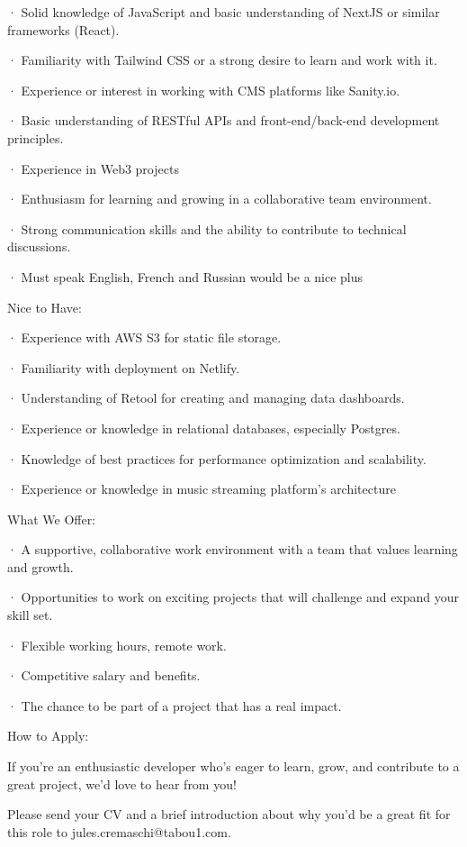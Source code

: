 · Solid knowledge of JavaScript and basic understanding of NextJS or similar frameworks (React).

· Familiarity with Tailwind CSS or a strong desire to learn and work with it.

· Experience or interest in working with CMS platforms like Sanity.io.

· Basic understanding of RESTful APIs and front-end/back-end development principles.

· Experience in Web3 projects

· Enthusiasm for learning and growing in a collaborative team environment.

· Strong communication skills and the ability to contribute to technical discussions.

· Must speak English, French and Russian would be a nice plus



Nice to Have:



· Experience with AWS S3 for static file storage.

· Familiarity with deployment on Netlify.

· Understanding of Retool for creating and managing data dashboards.

· Experience or knowledge in relational databases, especially Postgres.

· Knowledge of best practices for performance optimization and scalability.

· Experience or knowledge in music streaming platform's architecture



What We Offer:



· A supportive, collaborative work environment with a team that values learning and growth.

· Opportunities to work on exciting projects that will challenge and expand your skill set.

· Flexible working hours, remote work.

· Competitive salary and benefits.

· The chance to be part of a project that has a real impact.



How to Apply:



If you’re an enthusiastic developer who’s eager to learn, grow, and contribute to a great project, we’d love to hear from you!



Please send your CV and a brief introduction about why you’d be a great fit for this role to jules.cremaschi@tabou1.com.